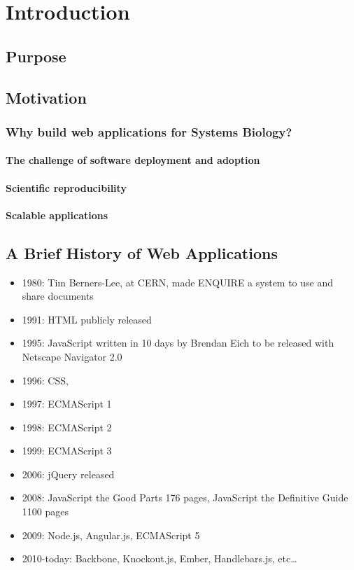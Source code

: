 \chapter{Introduction}

\section{Purpose}

\section{Motivation}

\subsection{Why build web applications for Systems Biology?}

\subsubsection{The challenge of software deployment and adoption}

\subsubsection{Scientific reproducibility}

\subsubsection{Scalable applications}

\section{A Brief History of Web Applications}
\autocite{w3c2014history}
\autocite{berners2014design}
\begin{itemize}
  \item 1980: Tim Berners-Lee, at CERN, made ENQUIRE a system to use and share documents
  \item 1991: HTML publicly released
  \item 1995: JavaScript written in 10 days by Brendan Eich to be released with Netscape Navigator 2.0
  \item 1996: CSS, 
  \item 1997: ECMAScript 1
  \item 1998: ECMAScript 2
  \item 1999: ECMAScript 3
  \item 2006: jQuery released
  \item 2008: JavaScript the Good Parts 176 pages, JavaScript the Definitive Guide 1100 pages
  \item 2009: Node.js, Angular.js, ECMAScript 5
  \item 2010-today: Backbone, Knockout.js, Ember, Handlebars.js, etc\ldots

\end{itemize}

